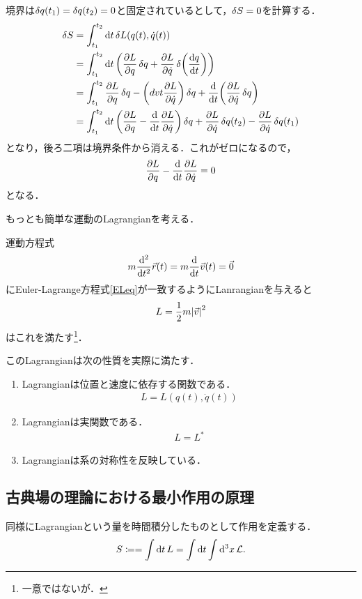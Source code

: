 	境界は$\var{q(t_1)} = \var{q(t_2)} = 0 $と固定されているとして，$\var{S} = 0$を計算する．
	\begin{align}
			\var{S} &= \int _{t_1}^{t_2} \dd{t} \var{L(q(t), \dot{q}(t))}\\
					&= \int _{t_1}^{t_2} \dd{t} \qty(\pdv{L}{q}\var{q} + \pdv{L}{\dot{q}}\var{\qty(\dv{q}{t})})\\
					&= \int_{t_1}^{t_2} \pdv{L}{q}\var{q} - \qty(dv{}{t}\pdv{L}{\dot{q}})\var{q} + \dv{}{t}\qty(\pdv{L}{\dot{q}}\var{q})\\
					&= \int_{t_1}^{t_2}\dd{t}\qty(\pdv{L}{q} - \dv{}{t}\pdv{L}{\dot{q}})\var{q} + \pdv{L}{\dot{q}}\var{q(t_2)} - \pdv{L}{\dot{q}}\var{q(t_1)}
	\end{align}
	となり，後ろ二項は境界条件から消える．これがゼロになるので，
	\begin{align}
			\pdv{L}{q} - \dv{}{t}\pdv{L}{\dot{q}} = 0 \label{ELeq}
	\end{align}
	となる．

	もっとも簡単な運動のLagrangianを考える．
	\begin{eg}[等速直線運動]
			運動方程式
			\begin{align}
					m\dv[2]{}{t}\vec{r}(t) = m \dv{}{t}\vec{v}(t) = \vec{0}
			\end{align}
			にEuler-Lagrange方程式\eqref{ELeq}が一致するようにLanrangianを与えると
			\begin{align}
					L = \frac{1}{2}m\abs{\vec{v}}^2
			\end{align}
			はこれを満たす\footnote{一意ではないが．}．

			このLagrangianは次の性質を実際に満たす．
			\begin{enumerate}
					\item Lagrangianは位置と速度に依存する関数である．
							\begin{align}
									L = L(q(t), \dot{q}(t))
							\end{align}
					\item Lagrangianは実関数である．
							\begin{align}
									L = L^{*}
							\end{align}
					\item Lagrangianは系の対称性を反映している．
			\end{enumerate}
	\end{eg}

	\subsection{古典場の理論における最小作用の原理}
	同様にLagrangianという量を時間積分したものとして作用を定義する．
	\begin{align}
			S \coloneqq = \int \dd{t} L = \int \dd{t}\int \dd[3]{x}\mathcal{L}.
	\end{align}
	
